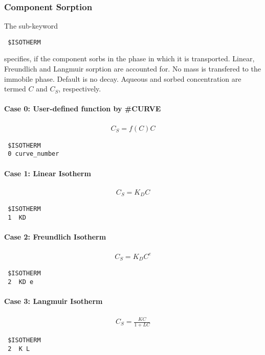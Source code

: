 \subsubsection{Component Sorption}
The sub-keyword
\begin{verbatim}
 $ISOTHERM
\end{verbatim}
specifies, if the component sorbs in the phase in which it is transported. Linear, Freundlich and Langmuir sorption are accounted for. No mass is transfered to the immobile phase. Default is no decay. Aqueous and sorbed concentration are termed $C$ and $C_S$, respectively.

\paragraph*{Case 0: User-defined function by \#CURVE}
\begin{eqnarray}
    C_S = f(C) C
\end{eqnarray}
\begin{verbatim}
 $ISOTHERM
 0 curve_number
\end{verbatim}

\paragraph*{Case 1: Linear Isotherm}
\begin{eqnarray}
    C_S = K_D C
\end{eqnarray}
\begin{verbatim}
 $ISOTHERM
 1  KD
\end{verbatim}

\paragraph*{Case 2: Freundlich Isotherm}
\begin{eqnarray}
    C_S = K_D C^e
\end{eqnarray}
\begin{verbatim}
 $ISOTHERM
 2  KD e
\end{verbatim}

\paragraph*{Case 3: Langmuir Isotherm}
\begin{eqnarray}
    C_S = \frac{K C}{1 + L C}
\end{eqnarray}
\begin{verbatim}
 $ISOTHERM
 2  K L
\end{verbatim}


